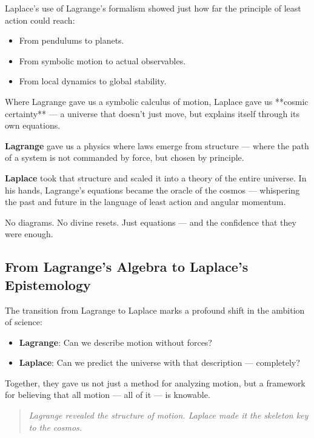 Laplace's use of Lagrange’s formalism showed just how far the principle of least action could reach:
\begin{itemize}
    \item From pendulums to planets.
    \item From symbolic motion to actual observables.
    \item From local dynamics to global stability.
\end{itemize}

Where Lagrange gave us a symbolic calculus of motion, Laplace gave us **cosmic certainty** — a universe that doesn’t just move, but explains itself through its own equations.

\vspace{1em}
\begin{tcolorbox}[colback=blue!5!white, colframe=blue!60!black, title={Laplace’s Determinism in a Lagrangian World}]
\textbf{Lagrange} gave us a physics where laws emerge from structure — where the path of a system is not commanded by force, but chosen by principle.

\textbf{Laplace} took that structure and scaled it into a theory of the entire universe. In his hands, Lagrange’s equations became the oracle of the cosmos — whispering the past and future in the language of least action and angular momentum.

No diagrams. No divine resets. Just equations — and the confidence that they were enough.
\end{tcolorbox}

\subsection{From Lagrange’s Algebra to Laplace’s Epistemology}

The transition from Lagrange to Laplace marks a profound shift in the ambition of science:
\begin{itemize}
    \item \textbf{Lagrange}: Can we describe motion without forces?
    \item \textbf{Laplace}: Can we predict the universe with that description — completely?
\end{itemize}

Together, they gave us not just a method for analyzing motion, but a framework for believing that all motion — all of it — is knowable.

\begin{quote}
\textit{Lagrange revealed the structure of motion.  
Laplace made it the skeleton key to the cosmos.}
\end{quote}



